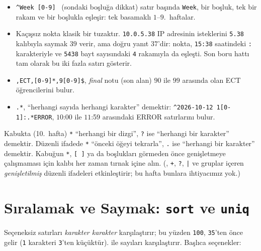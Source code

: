 \begin{itemize}
  \item \texttt{\textasciicircum Week [0-9] } (sondaki boşluğa dikkat) satır başında \texttt{Week}, bir boşluk, tek bir rakam ve bir boşlukla eşleşir: tek basamaklı $1$--$9$.~haftalar.
  \item Kaçışsız nokta klasik bir tuzaktır. \texttt{10.0.5.38} IP adresinin isteklerini \texttt{5.38} kalıbıyla saymak $39$ verir, ama doğru yanıt $37$'dir: nokta, \texttt{15:38} saatindeki \texttt{:} karakteriyle ve \texttt{5438} bayt sayısındaki \texttt{4} rakamıyla da eşleşti. Son  boru hattı tam olarak bu iki fazla satırı gösterir.
  \item \texttt{,ECT,[0-9]*,9[0-9]\$}, \emph{final} notu (son alan) $90$ ile $99$ arasında olan ECT öğrencilerini bulur.
  \item \texttt{.*}, ``herhangi sayıda herhangi karakter'' demektir: \texttt{\textasciicircum 2026-10-12 1[0-1]:.*ERROR}, $10$:00 ile $11$:59 arasındaki ERROR satırlarını bulur.
\end{itemize}

\begin{keyidea}
Kabukta (10.~hafta) \texttt{*} ``herhangi bir dizgi'', \texttt{?} ise ``herhangi bir karakter'' demektir. Düzenli ifadede \texttt{*} ``önceki öğeyi tekrarla'', \texttt{.} ise ``herhangi bir karakter'' demektir. Kabuğun \texttt{*}, \texttt{[ ]} ya da boşlukları  görmeden önce genişletmeye çalışmaması için kalıbı her zaman tırnak içine alın. (, \texttt{+}, \texttt{?}, \texttt{|} ve gruplar içeren \emph{genişletilmiş} düzenli ifadeleri etkinleştirir; bu hafta bunlara ihtiyacımız yok.)
\end{keyidea}

\section{Sıralamak ve Saymak: \texttt{sort} ve \texttt{uniq}}
\label{sec:sort}



Seçeneksiz  satırları \emph{karakter karakter} karşılaştırır; bu yüzden \texttt{100}, \texttt{35}'ten önce gelir (\texttt{1} karakteri \texttt{3}'ten küçüktür).  ile sayıları karşılaştırır. Başlıca seçenekler:

